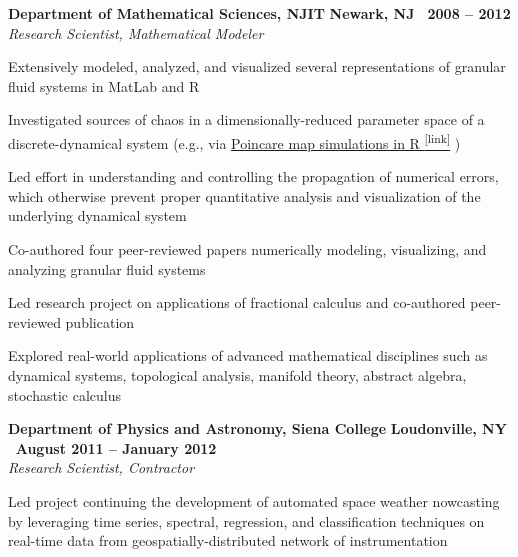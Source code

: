 \documentclass[10pt]{article}
\newcommand{\leftandright}[2]{\noindent\textbf{#1}\hfill
\textbf{#2}}
\begin{document}
\leftandright{Department of Mathematical Sciences, NJIT}{Newark, NJ \textbullet\, 2008 -- 2012}\\  
\vspace{-0.8em}
\textit{Research Scientist, Mathematical Modeler} 
\begin{itemize*}
  \item Extensively modeled, analyzed, and visualized several
    representations of granular fluid systems in MatLab and R
  \item Investigated sources of chaos in a 
    dimensionally-reduced parameter space of a discrete-dynamical system
    (e.g., via \href{http://kevin-urban.com/video/R__gamma-var_restitution-0.8.gif}{Poincare
    map simulations in R \textsuperscript{\tiny{[link]}}} )
  \item Led effort in understanding and controlling the propagation of numerical errors, 
    which otherwise prevent proper quantitative analysis and
    visualization of the underlying dynamical system
  \item Co-authored four peer-reviewed papers numerically modeling,
    visualizing, and analyzing granular fluid systems
  \item Led research project on applications of fractional calculus and
    co-authored peer-reviewed publication 
  \item
    Explored real-world applications of advanced mathematical disciplines such as
    dynamical systems, topological analysis, manifold theory, abstract
    algebra, stochastic calculus
\end{itemize*}



\leftandright{Department of Physics and Astronomy, Siena
College}{Loudonville, NY \textbullet\, August 2011 -- January 2012}\\  
\vspace{-0.8em}
\textit{Research Scientist, Contractor} 
\begin{itemize*}
  \item Led project continuing the development of automated space weather
    nowcasting by leveraging time series, spectral, regression, and
    classification techniques on real-time data from
    geospatially-distributed network of instrumentation
\end{itemize*}
\end{document}
